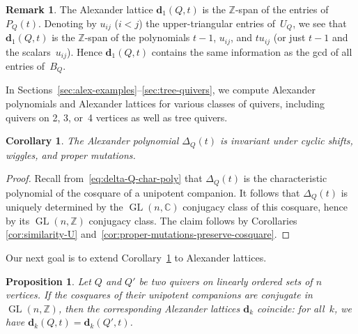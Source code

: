 \documentclass[11pt, letterpaper]{amsart}
\newcommand{\hide}[1]{}
\newtheorem{proposition}[theorem]{Proposition}
\newtheorem{corollary}[theorem]{Corollary}
\theoremstyle{definition}
\newtheorem{remark}[theorem]{Remark}
\numberwithin{equation}{section}
\def\ZZ{{\mathbb Z}}
\def\CC{{\mathbb C}}
\def\dd{{\mathbf{d}}}
\def\GL{{\operatorname{GL}}}
\begin{document}
\begin{remark}
\label{rem:d_1}
The Alexander lattice $\dd_1(Q,t)$  is the $\ZZ$-span of the entries of~$P_Q(t)$. 
Denoting by $u_{ij}$ ($i<j$) the upper-triangular entries of~$U_Q$, 
we see that 
$\dd_1(Q,t)$ is the $\ZZ$-span of the polynomials $t-1$, $u_{ij}$, and $tu_{ij}$ 
(or just $t-1$ and the scalars~$u_{ij}$).
Hence $\dd_1(Q,t)$ contains the same information as the gcd of all entries of~$B_Q$. 
\end{remark}

In Sections~\ref{sec:alex-examples}--\ref{sec:tree-quivers}, we compute Alexander polynomials and Alexander lattices for 
various classes of quivers, including quivers on 2, 3, or~4 vertices as well as tree quivers. 

\hide{
\begin{proposition}
If the unipotent companions of two quivers are integrally congruent, 
then their parametrized companions are integrally congruent as well. 
\end{proposition}

\begin{proof}
Indeed, if $U' = G U G^T$, then 
\begin{equation*}
t U' - (U')^T = t G U G^T - G U^T G^T = G (t U - U^T) G^T. \qedhere
\end{equation*}
\end{proof}
} %

\begin{corollary}
\label{cor:alex-poly-inv}
The Alexander polynomial $\Delta_Q(t)$ is invariant under cyclic shifts, wiggles, and proper mutations. 
\end{corollary}

\begin{proof}
Recall from~\eqref{eq:delta-Q-char-poly} that $\Delta_Q(t)$ 
is the characteristic polynomial of the cosquare of a unipotent companion.
It follows that $\Delta_Q(t)$ is uniquely determined by the $\GL(n,\CC)$ conjugacy class of this cosquare, 
hence by its $\GL(n,\ZZ)$ conjugacy class. 
The claim follows by Corollaries \ref{cor:similarity-U} and~\ref{cor:proper-mutations-preserve-cosquare}. 
\end{proof}

Our next goal is to extend Corollary~\ref{cor:alex-poly-inv} to Alexander lattices. 


\begin{proposition}
\label{prop:Ut}
Let $Q$ and $Q'$ be two quivers on linearly ordered sets of $n$ vertices. 
If the cosquares of their unipotent companions are conjugate in $\GL(n,\ZZ)$, 
then the corresponding Alexander lattices $\dd_k$ coincide: for all~$k$, we have $\dd_k(Q,t)=\dd_k(Q',t)$.
\end{proposition}
\end{document}
